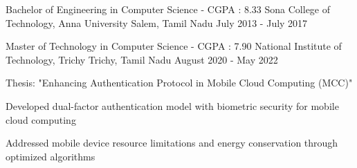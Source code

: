 \documentclass[11pt, a4paper]{awesome-cv} %
\begin{document}
\makecvheader %

\begin{cventries}
\cventry
    {Bachelor of Engineering in Computer Science  -  CGPA : 8.33} %
    {Sona College of Technology, Anna University} %
    {Salem, Tamil Nadu} %
    {July 2013 - July 2017} %
    {}

    \cventry
    {Master of Technology in Computer Science  - CGPA : 7.90} %
    {National Institute of Technology, Trichy} %
    {Trichy, Tamil Nadu} %
    {August 2020 - May 2022} %
    {
      \begin{cvitems}
        \item {Thesis: "Enhancing Authentication Protocol in Mobile Cloud Computing (MCC)"}
        \item {Developed dual-factor authentication model with biometric security for mobile cloud computing}
        \item {Addressed mobile device resource limitations and energy conservation through optimized algorithms}
      \end{cvitems}
    }
\end{cventries}

\begin{cvskills}
\end{cvskills}
\end{document}
